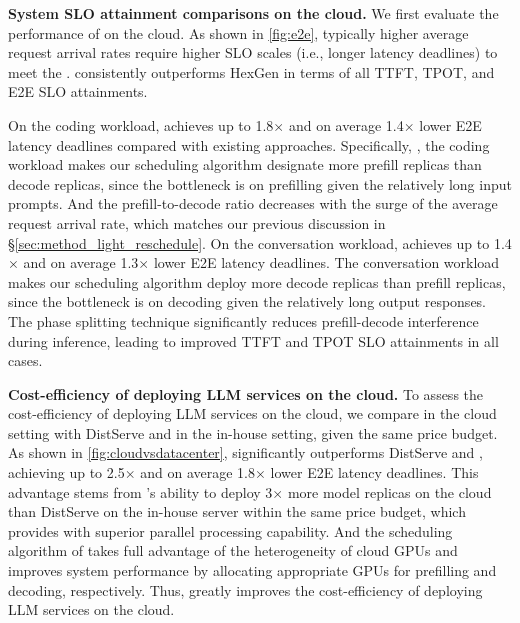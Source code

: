 \noindent \textbf{System SLO attainment comparisons on the cloud.} 
We first evaluate the performance of \sys on the cloud. As shown in \autoref{fig:e2e}, typically higher average request arrival rates require higher SLO scales (i.e., longer latency deadlines) to meet the . \sys consistently outperforms HexGen in terms of all TTFT, TPOT, and E2E SLO attainments.

On the coding workload, \sys achieves up to 1.8$\times$ and on average 1.4$\times$ lower E2E latency deadlines compared with existing approaches. Specifically, , the coding workload makes our scheduling algorithm designate more prefill replicas than decode replicas, since the bottleneck is on prefilling given the relatively long input prompts. And the prefill-to-decode ratio decreases with the surge of the average request arrival rate, which matches our previous discussion in \S\ref{sec:method_light_reschedule}. On the conversation workload, \sys achieves up to 1.4$\times$ and on average 1.3$\times$ lower E2E latency deadlines. The conversation workload makes our scheduling algorithm deploy more decode replicas than prefill replicas, since the bottleneck is on decoding given the relatively long output responses. The phase splitting technique significantly reduces prefill-decode interference during inference, leading to improved TTFT and TPOT SLO attainments in all cases.


\noindent \textbf{Cost-efficiency of deploying LLM services on the cloud.} To assess the cost-efficiency of deploying LLM services on the cloud, we compare \sys in the cloud setting with DistServe and  in the in-house setting, given the same price budget. As shown in \autoref{fig:cloudvsdatacenter}, \sys significantly outperforms DistServe and , achieving up to 2.5$\times$ and on average 1.8$\times$ lower E2E latency deadlines. This advantage stems from \sys's ability to deploy 3$\times$ more model replicas on the cloud than DistServe on the in-house server within the same price budget, which provides \sys with superior parallel processing capability. And the scheduling algorithm of \sys takes full advantage of the heterogeneity of cloud GPUs and improves system performance by allocating appropriate GPUs for prefilling and decoding, respectively. Thus, \sys greatly improves the cost-efficiency of deploying LLM services on the cloud.

